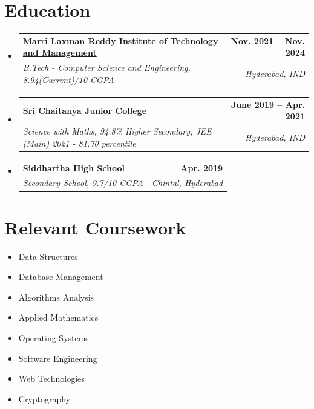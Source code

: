 \documentclass[a4paper,11pt]{article}
\makeatletter
\newcommand{\resumeItem}[1]{
  \item\small{
    {#1 \vspace{-2pt}}
  }
}
\newcommand{\resumeSubheading}[4]{
  \vspace{-2pt}\item
    \begin{tabular*}{0.97\textwidth}[t]{l@{\extracolsep{\fill}}r}
      \textbf{#1} & \textbf{\small #2} \\
      \textit{\small#3} & \textit{\small #4} \\
    \end{tabular*}\vspace{-7pt}
}
\newcommand{\resumeSubSubheading}[2]{
    \item
    \begin{tabular*}{0.97\textwidth}{l@{\extracolsep{\fill}}r}
      \textit{\small#1} & \textit{\small #2} \\
    \end{tabular*}\vspace{-7pt}
}
\newcommand{\resumeSubHeadingListStart}{\begin{itemize}[leftmargin=0.15in, label={}]}
\newcommand{\resumeSubHeadingListEnd}{\end{itemize}}
\newcommand{\resumeItemListStart}{\begin{itemize}}
\newcommand{\resumeItemListEnd}{\end{itemize}\vspace{-5pt}}
\makeatother
\begin{document}
\vspace{-15pt}
\section{Education}
  \resumeSubHeadingListStart
    \resumeSubheading
      {\href{https://mlritm.ac.in}{Marri Laxman Reddy Institute of Technology and Management}}{Nov. 2021 -- Nov. 2024}
      {B.Tech - Computer Science and Engineering, 8.94(Current)/10 CGPA}{Hyderabad, IND}
    \resumeSubheading
      {Sri Chaitanya Junior College}{June 2019 -- Apr. 2021}
      {Science with Maths, 94.8\% Higher Secondary, JEE (Main) 2021 - 81.70 percentile}{Hyderabad, IND}
    \resumeSubheading
      {Siddhartha High School}{Apr. 2019}
      {Secondary School, 9.7/10 CGPA}{Chintal, Hyderabad}
  \resumeSubHeadingListEnd

\section{Relevant Coursework}
        \begin{multicols}{4}
            \begin{itemize}[itemsep=-3pt, parsep=3pt]
              \small
                \item Data Structures
                \item Database Management
                \item Algorithms Analysis
                \item Applied Mathematics
                \item Operating Systems
                \item Software Engineering
                \item Web Technologies
                \item Cryptography
              \end{itemize}
        \end{multicols}
        \vspace*{2.0\multicolsep}

    
\end{document}
